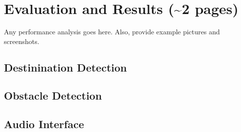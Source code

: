 \section{Evaluation and Results (\textasciitilde 2 pages)}
\label{sec:eval}

Any performance analysis goes here. Also, provide example pictures and screenshots.

\subsection{Destinination Detection}
\label{sec:eval-dest}


\subsection{Obstacle Detection}
\label{sec:eval-obs}


\subsection{Audio Interface}
\label{sec:eval-audio}
